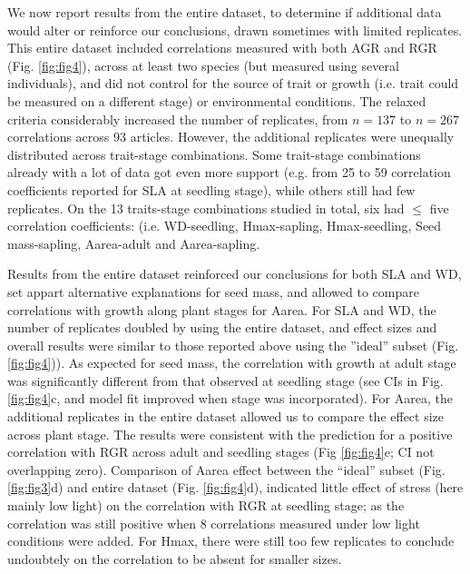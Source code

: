 \documentclass[a4paper,11pt]{article}
\begin{document}
We now report results from the entire dataset, to determine if additional data would alter or reinforce our conclusions, drawn sometimes with limited replicates. This entire dataset included correlations measured with both AGR and RGR (Fig. \ref{fig:fig4}), across at least two species (but measured using several individuals), and did not control for the source of trait or growth (i.e. trait could be measured on a different stage) or environmental conditions. The relaxed criteria considerably increased the number of replicates, from $n = 137$ to $n = 267$ correlations across 93 articles. However, the additional replicates were unequally distributed across trait-stage combinations. Some trait-stage combinations already with a lot of data got even more support (e.g. from 25 to 59 correlation coefficients reported for SLA at seedling stage), while others still had few replicates. On the 13 traits-stage combinations studied in total, six had $\le$ five correlation coefficients: (i.e. WD-seedling, Hmax-sapling, Hmax-seedling, Seed mass-sapling, Aarea-adult and Aarea-sapling. 


Results from the entire dataset reinforced our conclusions for both SLA and WD, set appart alternative explanations for seed mass, and allowed to compare correlations with growth along plant stages for Aarea. For SLA and WD, the number of replicates doubled by using the entire dataset, and effect sizes and overall results were similar to those reported above using the ''ideal'' subset (Fig. \ref{fig:fig4})). As expected for seed mass, the correlation with growth at adult stage was significantly different from that observed at seedling stage (see CIs in Fig. \ref{fig:fig4}c, and model fit improved when stage was incorporated). For Aarea, the additional replicates in the entire dataset allowed us to compare the effect size across plant stage. The results were consistent with the prediction for a positive correlation with RGR across adult and seedling stages (Fig \ref{fig:fig4}e; CI not overlapping zero). Comparison of Aarea effect between the ``ideal'' subset (Fig. \ref{fig:fig3}d) and entire dataset (Fig. \ref{fig:fig4}d), indicated little effect of stress (here mainly low light) on the correlation with RGR at seedling stage; as the correlation was still positive when 8 correlations measured under low light conditions were added. For Hmax, there were still too few replicates to conclude undoubtely on the correlation to be absent for smaller sizes. 
\end{document}
